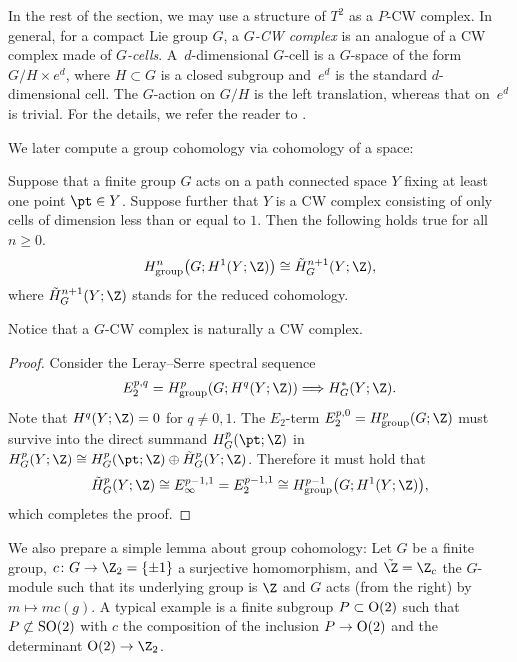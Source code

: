 In the rest of the section, we may use a structure of $T^2$ as a $P$-CW complex. In general, for a compact Lie group $G$, a \textit{$G$-CW complex} is an analogue of a CW complex made of \textit{$G$-cells}. A~$d$-dimensional $G$-cell is a $G$-space of the form $G/H \times e^d$, where $H \subset G$ is a closed subgroup and~$e^d$ is the standard $d$-dimensional cell. The $G$-action on $G/H$ is the left translation, whereas that on~$e^d$ is trivial. For the details, we refer the reader to \cite{May}.

We later compute a group cohomology via cohomology of a space:

\begin{lem} \label{lem:1_dim_complex}
Suppose that a finite group $G$ acts on a path connected space $Y$ fixing at least one point $\pt \in Y$. Suppose further that $Y$ is a CW complex consisting of only cells of dimension less than or equal to $1$. Then the following holds true for all $n \ge 0$.
\begin{gather*}
H^n_{\mathrm{group}}\big(G; H^1(Y; \Z)\big) \cong \tilde{H}^{n+1}_G(Y; \Z),
\end{gather*}
where $\tilde{H}^{n+1}_G(Y; \Z)$ stands for the reduced cohomology.
\end{lem}

Notice that a $G$-CW complex is naturally a CW complex.

\begin{proof}
Consider the Leray--Serre spectral sequence
\begin{gather*}
E_2^{p, q} = H^p_{\mathrm{group}}(G; H^q(Y; \Z))\Longrightarrow H^*_G(Y; \Z).
\end{gather*}
Note that $H^q(Y; \Z) = 0$ for $q \neq 0, 1$. The $E_2$-term $E_2^{p, 0} = H^p_{\mathrm{group}}(G; \Z)$ must survive into the direct summand $H^p_G(\pt; \Z)$ in $H^p_G(Y; \Z) \cong H^p_G(\pt; \Z) \oplus \tilde{H}^p_G(Y; \Z)$. Therefore it must hold that
\begin{gather*}
\tilde{H}^p_G(Y; \Z) \cong E^{p-1, 1}_\infty = E^{p-1, 1}_2\cong H^{p-1}_{\mathrm{group}}\big(G; H^1(Y; \Z)\big),
\end{gather*}
which completes the proof.
\end{proof}

We also prepare a simple lemma about group cohomology: Let $G$ be a f\/inite group, $c \colon G \to \Z_2 = \{ \pm 1 \}$ a surjective homomorphism, and $\tilde{\Z} = \Z_c$ the $G$-module such that its underlying group is $\Z$ and $G$ acts (from the right) by $m \mapsto m c(g)$. A typical example is a f\/inite subgroup $P \subset {\rm O}(2)$ such that $P \not\subset {\rm SO}(2)$ with $c$ the composition of the inclusion $P \to {\rm O}(2)$ and the determinant ${\rm O}(2) \to \Z_2$.

